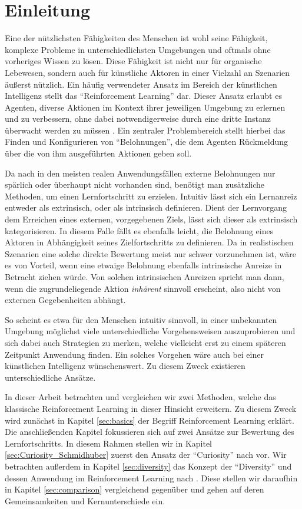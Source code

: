 \section{Einleitung}
\label{sec:intro}
Eine der nützlichsten Fähigkeiten des Menschen ist wohl seine Fähigkeit, komplexe Probleme in unterschiedlichsten Umgebungen und oftmals ohne vorheriges Wissen zu lösen.
Diese Fähigkeit ist nicht nur für organische Lebewesen, sondern auch für künstliche Aktoren in einer Vielzahl an Szenarien äußerst nützlich.
Ein häufig verwendeter Ansatz im Bereich der künstlichen Intelligenz stellt das ``Reinforcement Learning'' dar. Dieser Ansatz erlaubt es Agenten, diverse Aktionen im Kontext ihrer jeweiligen Umgebung zu erlernen und zu verbessern, ohne dabei notwendigerweise durch eine dritte Instanz überwacht werden zu müssen \cite{reinforcement_learning_kaelbling}. 
Ein zentraler Problembereich stellt hierbei das Finden und Konfigurieren von ``Belohnungen'', die dem Agenten Rückmeldung über die von ihm ausgeführten Aktionen geben soll.

Da nach \cite{reachability_savinov} in den meisten realen Anwendungsfällen externe Belohnungen nur spärlich oder überhaupt nicht vorhanden sind, benötigt man zusätzliche Methoden, um einen Lernfortschritt zu erzielen.
Intuitiv lässt sich ein Lernanreiz entweder als extrinsisch, oder als intrinsisch definieren. Dient der Lernvorgang dem Erreichen eines externen, vorgegebenen Ziels, lässt sich dieser als extrinsisch kategorisieren. In diesem Falle fällt es ebenfalls leicht, die Belohnung eines Aktoren in Abhängigkeit seines Zielfortschritts zu definieren. 
Da in realistischen Szenarien eine solche direkte Bewertung meist nur schwer vorzunehmen ist, wäre es von Vorteil, wenn eine etwaige Belohnung ebenfalls intrinsische Anreize in Betracht ziehen würde. Von solchen intrinsischen Anreizen spricht man dann, wenn die zugrundeliegende Aktion \textit{inhärent} sinnvoll erscheint, also nicht von  externen Gegebenheiten abhängt.

So scheint es etwa für den Menschen intuitiv sinnvoll, in einer unbekannten Umgebung möglichst viele unterschiedliche Vorgehensweisen auszuprobieren und sich dabei auch Strategien zu merken, welche vielleicht erst zu einem späteren Zeitpunkt Anwendung finden. Ein solches Vorgehen wäre auch bei einer künstlichen Intelligenz wünschenswert. Zu diesem Zweck existieren unterschiedliche Ansätze.

In dieser Arbeit betrachten und vergleichen wir zwei Methoden, welche das klassische Reinforcement Learning in dieser Hinsicht erweitern.
Zu diesem Zweck wird zunächst in Kapitel \ref{sec:basics} der Begriff Reinforcement Learning erklärt.
Die anschließenden Kapitel fokussieren sich auf zwei Ansätze zur Bewertung des Lernfortschritts.
In diesem Rahmen stellen wir in Kapitel \ref{sec:Curiosity_Schmidhuber} zuerst den Ansatz der ``Curiosity'' nach \cite{curiosity_schmidhuber} vor. 
Wir betrachten außerdem in Kapitel \ref{sec:diversity} das Konzept der ``Diversity'' und dessen Anwendung im Reinforcement Learning nach \cite{diversity_eysenbach}.
Diese stellen wir daraufhin in Kapitel \ref{sec:comparison} vergleichend gegenüber und gehen auf deren Gemeinsamkeiten und Kernunterschiede ein.

